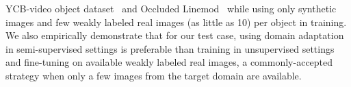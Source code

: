 \documentclass[letterpaper, 10 pt, conference]{ieeeconf}  %
\newcommand{\phil}[1]{\textcolor{blue}{#1}}
\newcommand{\jp}[1]{\textcolor{orange}{#1}}
\begin{document}
YCB-video object dataset~\cite{xiang2017posecnn} and Occluded Linemod~\cite{krull2015learning} while using only synthetic images and few weakly labeled real images (as little as 10) per object in training. %
We also empirically demonstrate that for our test case, using domain adaptation in semi-supervised settings is preferable than training in unsupervised settings and fine-tuning on available weakly labeled real images, a commonly-accepted strategy when only a few images from the target domain are available.

\end{document}
